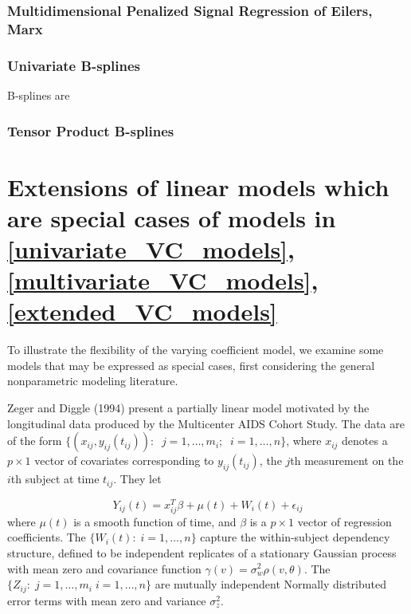 \documentclass[12pt]{article}
\newcommand*\outlineskeleton{\color{green}}
\begin{document}
\subsubsection{{\outlineskeleton Multidimensional Penalized Signal Regression of Eilers, Marx}}

\subsubsection{{\outlineskeleton Univariate B-splines}}

B-splines are 

\subsubsection{{\outlineskeleton Tensor Product B-splines}}


\section{{\outlineskeleton Extensions of linear models which are special cases of models in \ref{univariate_VC_models},\ref{multivariate_VC_models},\ref{extended_VC_models}}}
To illustrate the flexibility of the varying coefficient model, we examine some models that may be expressed as special cases, first considering the general nonparametric modeling literature. 




Zeger and Diggle (1994) present a partially linear model motivated by the longitudinal data produced by the Multicenter AIDS Cohort Study. The data are of the form $\lbrace \left(x_{ij},y_{ij}\left(t_{ij}\right)\right): \;\; j=1,\dots,m_i;\;\;i=1,\dots,n \rbrace$, where $x_{ij}$ denotes a $p \times 1$ vector of covariates corresponding to $y_{ij}\left(t_{ij}\right)$, the $j$th measurement on the $i$th subject at time $t_{ij}$. They let 

\begin{equation} \label{eq:zeger_diggle_VC_model}
Y_{ij}\left(t\right) =  x_{ij}^T\beta + \mu\left(t\right) + W_i\left(t\right) + \epsilon_{ij}
\end{equation}
\noindent
where $\mu\left(t\right)$ is a smooth function of time, and $\beta$ is a $p \times 1$ vector of regression coefficients. The $\lbrace W_i\left(t\right):\;i=1,\dots,n \rbrace$ capture the within-subject dependency structure, defined to be independent replicates of a stationary Gaussian process with mean zero and covariance function $\gamma\left(v\right) = \sigma_w^2\rho\left(v, \theta \right)$. The $\lbrace Z_{ij}:\;j=1,\dots,m_i\;i=1,\dots,n \rbrace$ are mutually independent Normally distributed error terms with mean zero and variance $\sigma_z^2$.
\end{document}
